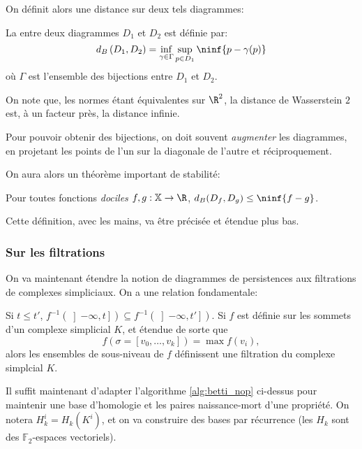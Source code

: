 On définit alors une distance sur deux tels diagrammes:
\begin{definition}
	La  entre deux diagrammes $D_{1}$ et $D_{2}$ est définie par:
	\begin{equation*}
		d_{B}\left(D_{1}, D_{2}\right) = \inf_{\gamma \in \Gamma}\sup_{p \in D_{1}} \ninf{p - \gamma(p)}
	\end{equation*}
	où $\Gamma$ est l'ensemble des bijections entre $D_{1}$ et $D_{2}$.
\end{definition}
On note que, les normes étant équivalentes sur $\R^{2}$, la distance de Wasserstein $2$ est, à un facteur près, la distance infinie.

\begin{remarque}
	Pour pouvoir obtenir des bijections, on doit souvent \emph{augmenter} les diagrammes, en projetant les points de l'un sur la diagonale de l'autre et réciproquement.
\end{remarque}

On aura alors un théorème important de stabilité:
\begin{thm}
	Pour toutes fonctions \emph{dociles} $f, g: \mathbb{X}\to \R$, $d_{B}(D_{f}, D_{g}) \leq \ninf{f - g}$.
\end{thm}


Cette définition, avec les mains, va être précisée et étendue plus bas.

\subsubsection{Sur les filtrations}
On va maintenant étendre la notion de diagrammes de persistences aux filtrations de complexes simpliciaux.
On a une relation fondamentale:
\begin{proposition}
	Si $t \leq t'$, $f^{-1}\left(\left]-\infty, t\right]\right) \subseteq f^{-1}\left(\left]-\infty, t'\right]\right)$.
	Si $f$ est définie sur les sommets d'un complexe simplicial $K$, et étendue de sorte que
	\begin{equation*}
		f\left(\sigma = \left[v_{0}, \ldots, v_{k}\right]\right) = \max f\left(v_{i}\right),
	\end{equation*}
	alors les ensembles de sous-niveau de $f$ définissent une filtration du complexe simplcial $K$.
\end{proposition}

Il suffit maintenant d'adapter l'algorithme \ref{alg:betti_nop} ci-dessus pour maintenir une base d'homologie et les paires naissance-mort d'une propriété.
On notera $H_{k}^{i} = H_{k}\left(K^{i}\right)$, et on va construire des bases par récurrence (les $H_{k}$ sont des $\mathbb{F}_{2}$-espaces vectoriels).


